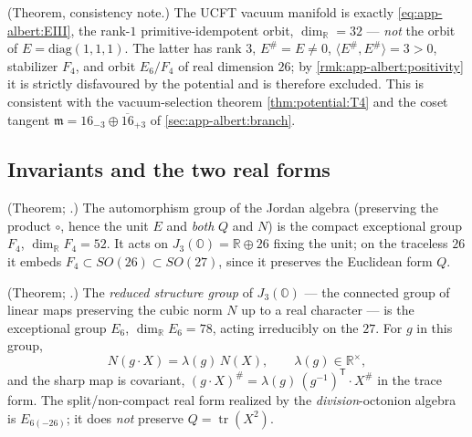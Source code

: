 \begin{remark}\label{rmk:app-albert:vacuum}
\textup{(Theorem, consistency note.)}
The UCFT vacuum manifold is exactly \eqref{eq:app-albert:EIII}, the rank-$1$
primitive-idempotent orbit, $\dim_{\mathbb R}=32$ --- \emph{not} the orbit of
$E=\mathrm{diag}(1,1,1)$. The latter has rank $3$, $E^\#=E\neq0$,
$\langle E^\#,E^\#\rangle=3>0$, stabilizer $F_4$, and orbit $E_6/F_4$ of real
dimension $26$; by \autoref{rmk:app-albert:positivity} it is strictly disfavoured
by the potential and is therefore excluded. This is consistent with the
vacuum-selection theorem \autoref{thm:potential:T4} and the coset tangent
$\mathfrak m=16_{-3}\oplus\overline{16}_{+3}$ of \autoref{sec:app-albert:branch}.
\end{remark}

\subsection{Invariants and the two real forms}
\label{sec:app-albert:invariants}

\begin{theorem}[$F_4=\mathrm{Aut}(J_3(\mathbb O))$]\label{thm:app-albert:F4}
\label{thm:Invs}
\textup{(Theorem; \cite{Schafer:1966,Yokota:2009}.)}
The automorphism group of the Jordan algebra (preserving the product $\circ$,
hence the unit $E$ and \emph{both} $Q$ and $N$) is the compact exceptional group
$F_4$, $\dim_{\mathbb R}F_4=52$. It acts on $J_3(\mathbb O)=\mathbb R\oplus 26$
fixing the unit; on the traceless $26$ it embeds $F_4\subset SO(26)\subset
SO(27)$, since it preserves the Euclidean form $Q$.
\end{theorem}

\begin{theorem}[Reduced structure group $=E_6$]\label{thm:app-albert:E6}
\textup{(Theorem; \cite{Jacobson:1968,Springer:2000}.)}
The \emph{reduced structure group} of $J_3(\mathbb O)$ --- the connected group of
linear maps preserving the cubic norm $N$ up to a real character --- is the
exceptional group $E_6$, $\dim_{\mathbb R}E_6=78$, acting irreducibly on the $27$.
For $g$ in this group,
\begin{equation}\label{eq:app-albert:character}
  N(g\cdot X)=\lambda(g)\,N(X),\qquad \lambda(g)\in\mathbb R^\times,
\end{equation}
and the sharp map is covariant, $(g\cdot X)^\#=\lambda(g)\,(g^{-1})^{\mathsf T}\!
\cdot X^\#$ in the trace form. The split/non-compact real form realized by the
\emph{division}-octonion algebra is $E_{6(-26)}$; it does \emph{not} preserve
$Q=\operatorname{tr}(X^2)$.
\end{theorem}

